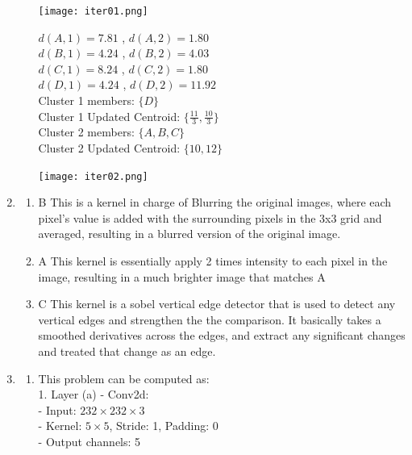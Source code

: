 \documentclass[12pt]{article}
\begin{document}
\begin{enumerate}
\begin{enumerate}
\begin{tcolorbox}[title = 1st Iter, myblock]
  \end{tcolorbox} 
  \texttt{[image: iter01.png]}\\
  \begin{tcolorbox}[title = 2nd Iter, myblock]
    \(d(A,1) = 7.81 \) , \(d(A, 2) = 1.80\) \\
    \(d(B,1) = 4.24\) , \(d(B, 2) = 4.03 \) \\
    \(d(C,1) = 8.24\) , \(d(C, 2) = 1.80  \) \\
    \(d(D,1) = 4.24 \) , \(d(D, 2) = 11.92\) \\
    Cluster 1 members: \(\{ D \}\) \\
    Cluster 1 Updated Centroid: \(\{\frac{11}{3}, \frac{10}{3}\}\)\\
    Cluster 2 members: \(\{A, B, C\}\)\\
    Cluster 2 Updated Centroid: \(\{10, 12\}\)\\
  \end{tcolorbox} 
\texttt{[image: iter02.png]}
\end{enumerate}

\item
  \begin{enumerate}
  \item B
    This is a kernel in charge of Blurring the original images, where each pixel's value is added with the surrounding pixels in the 3x3 grid and averaged, resulting in a blurred version of the original image.
  \item A
    This kernel is essentially apply 2 times intensity to each pixel in the image, resulting in a much brighter image that matches A
  \item C
    This kernel is a sobel vertical edge detector that is used to detect any vertical edges and strengthen the the comparison. It basically takes a smoothed derivatives across the edges, and extract any significant changes and treated that change as an edge.
  \end{enumerate}

\item
  \begin{enumerate}
  \item This problem can be computed as: \\
  1. Layer (a) - Conv2d:\\
  - Input: \(232 \times 232 \times 3\)\\
  - Kernel: \(5 \times 5\), Stride: 1, Padding: 0\\
  - Output channels: 5\\
  

\end{enumerate}
\end{enumerate}
\end{document}

